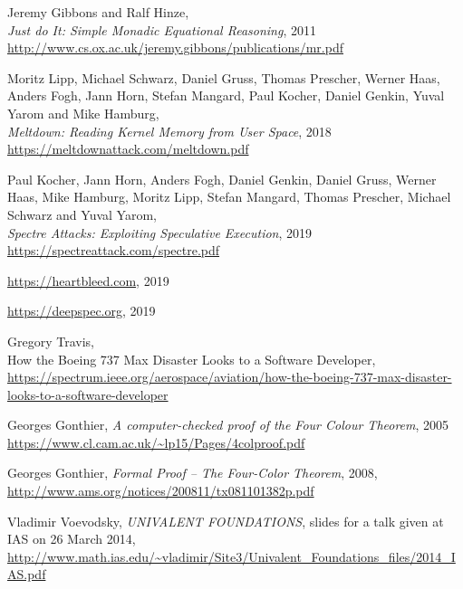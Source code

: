 \documentclass[declaration,inz,english,shortabstract]{iithesis}
\begin{document}
\begin{thebibliography}{1}

        Jeremy Gibbons and Ralf Hinze, \\
        \textit{Just do It: Simple Monadic Equational Reasoning}, 2011 \\
        \url{http://www.cs.ox.ac.uk/jeremy.gibbons/publications/mr.pdf}

        Moritz Lipp, Michael Schwarz, Daniel Gruss, Thomas Prescher, Werner Haas, Anders Fogh, Jann Horn, Stefan Mangard, Paul Kocher, Daniel Genkin, Yuval Yarom and Mike Hamburg, \\
        \textit{Meltdown: Reading Kernel Memory from User Space}, 2018 \\
        \url{https://meltdownattack.com/meltdown.pdf}

        Paul Kocher, Jann Horn, Anders Fogh, Daniel Genkin, Daniel Gruss, Werner Haas, Mike Hamburg, Moritz Lipp, Stefan Mangard, Thomas Prescher, Michael Schwarz and Yuval Yarom, \\
        \textit{Spectre Attacks: Exploiting Speculative Execution}, 2019 \\
        \url{https://spectreattack.com/spectre.pdf}
    
        \url{https://heartbleed.com},
        2019

        \url{https://deepspec.org},
        2019

        Gregory Travis, \\
        How the Boeing 737 Max Disaster Looks to a Software Developer, \\
        \url{https://spectrum.ieee.org/aerospace/aviation/how-the-boeing-737-max-disaster-looks-to-a-software-developer}
    
        Georges Gonthier,
        \textit{A computer-checked proof of the Four Colour Theorem}, 2005 \\
        \url{https://www.cl.cam.ac.uk/~lp15/Pages/4colproof.pdf}
    
        Georges Gonthier,
        \textit{Formal Proof -- The Four-Color Theorem}, 2008, \\
        \url{http://www.ams.org/notices/200811/tx081101382p.pdf}

        Vladimir Voevodsky,
        \textit{UNIVALENT FOUNDATIONS},
        slides for a talk given at IAS on 26 March 2014, \\
        \url{http://www.math.ias.edu/~vladimir/Site3/Univalent_Foundations_files/2014_IAS.pdf}


\end{thebibliography}
\end{document}

